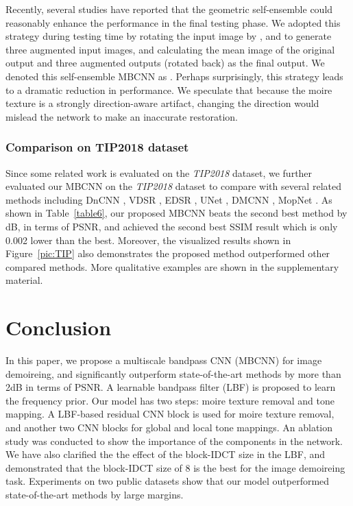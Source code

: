 \documentclass[10pt,twocolumn,letterpaper]{article}
\begin{document}
Recently, several studies have reported that the geometric self-ensemble could reasonably enhance the performance in the final testing phase. 
We adopted this strategy during testing time by rotating the input image by ,  and  to generate three augmented input images, and calculating the mean image of the original output and three augmented outputs (rotated back) as the final output. 
We denoted this self-ensemble MBCNN as . 
Perhaps surprisingly, this strategy leads to a dramatic reduction in performance. 
We speculate that because the moire texture is a strongly direction-aware artifact, changing the direction would mislead the network to make an inaccurate restoration.


\subsubsection{Comparison on TIP2018 dataset}
Since some related work is evaluated on the \emph{TIP2018} dataset, we further evaluated our MBCNN on the \emph{TIP2018} dataset to compare with several related methods including
DnCNN \cite{zhang2017beyond}, VDSR \cite{kim2016accurate}, EDSR \cite{lim2017enhanced}, UNet \cite{UNet}, DMCNN \cite{sun2018moire}, MopNet \cite{he2019mop}.
As shown in Table~\ref{table6}, our proposed MBCNN beats the second best method by  dB, in terms of PSNR, and achieved the second best SSIM result which is only 0.002 lower than the best. 
Moreover, the visualized results shown in Figure~\ref{pic:TIP} also demonstrates the proposed method outperformed other compared methods. More qualitative examples are shown in the supplementary material.


\section{Conclusion}

In this paper, we propose a multiscale bandpass CNN (MBCNN) for image demoireing, and significantly outperform state-of-the-art methods by more than 2dB in terms of PSNR. A learnable bandpass filter (LBF) is proposed to learn the frequency prior. Our model has two steps: moire texture removal and tone mapping. A LBF-based residual CNN block is used for moire texture removal, and another two CNN blocks for global and local tone mappings. An ablation study was conducted to show the importance of the components in the network. We have also clarified the the effect of the block-IDCT size in the LBF, and demonstrated that the block-IDCT size of 8 is the best for the image demoireing task. Experiments on two public datasets show that our model outperformed state-of-the-art methods by large margins.




{\small


}
\end{document}
